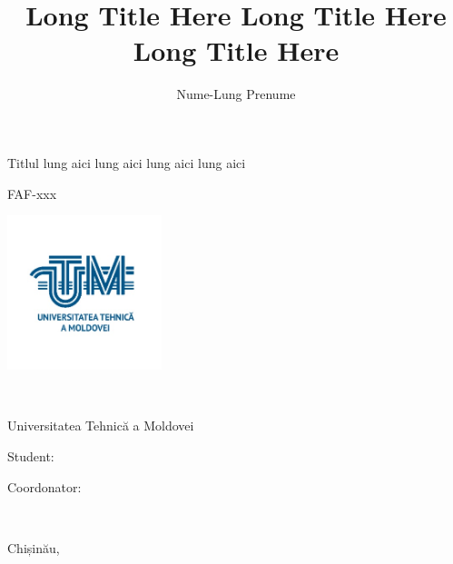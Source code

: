 \title
    {Long Title Here Long Title Here Long Title Here}
    {Titlul lung aici lung aici lung aici lung aici}

\author{Nume-Lung Prenume}{FAF-xxx}



\begin{titlepage}
	\begin{titlepagefont}
	    \centering
	    \bfseries
	    
	    \begin{minipage}{0.3\textwidth}
	        \includegraphics[height=4.5cm]{cover/utmlogo.jpg}
	    \end{minipage}
	    ~
	    \begin{minipage}{0.65\textwidth}
	        {\Large Universitatea Tehnică a Moldovei}
	    \end{minipage}
    	
    	\vfill
    	
    	{\LARGE \titleen \par}
        {\LARGE \titlero \par}
    	
    	\vfill
    	
    	\hfill
        \begin{minipage}{0.2\textwidth}
            \raggedright
            {\Large Student: \par}
            \bigskip
            {\Large Coordonator: \par}
            {\Large \quad \par}
	    \end{minipage}
	    ~
	    \begin{minipage}{0.5\textwidth}
	        \raggedleft
	        {\Large \authorname \par}
	        \bigskip
	        {\Large \supername \par}
	        {\Large \supertitle \par}
	    \end{minipage}
    	
    	\vfill

    	{\Large Chișinău, \degreeyear \par}
	
	\end{titlepagefont}
\end{titlepage}
